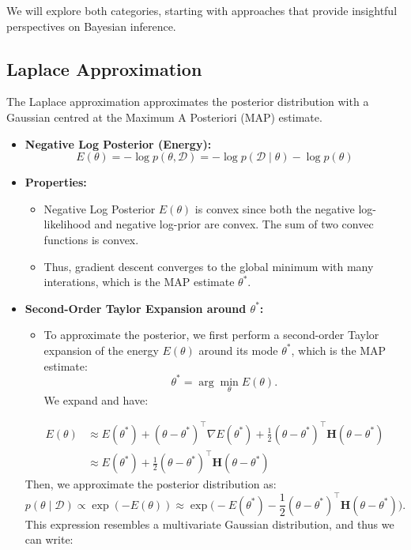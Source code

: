 We will explore both categories, starting with approaches that provide insightful perspectives on Bayesian inference.

\subsection{Laplace Approximation}

The Laplace approximation approximates the posterior distribution with a Gaussian centred at the Maximum A Posteriori (MAP) estimate.

\begin{itemize}
    \item \textbf{Negative Log Posterior (Energy):}
    \[
    E(\theta) = -\log p(\theta, \mathcal{D}) = -\log p(\mathcal{D} \mid \theta) - \log p(\theta)
    \]
    \item \textbf{Properties:}
    \begin{itemize}
        \item Negative Log Posterior $E(\theta)$ is convex since both the negative log-likelihood and negative log-prior are convex. The sum of two convec functions is convex.
        \item Thus, gradient descent converges to the global minimum with many interations, which is the MAP estimate $\theta^{*}$.
    \end{itemize}
    \item \textbf{Second-Order Taylor Expansion around $\theta^{*}$:}
    \begin{itemize}
        \item To approximate the posterior, we first perform a second-order Taylor expansion of the energy $E(\theta)$ around its mode $\theta^{*}$, which is the MAP estimate: 
        \[
        \theta^* = \arg\min_{\theta} E(\theta).
        \]
        We expand and have:
    \end{itemize}
    \begin{align*}
        E(\theta) &\approx E(\theta^*) + (\theta - \theta^*)^\top \nabla E(\theta^*) + \frac{1}{2} (\theta - \theta^*)^\top \mathbf{H} (\theta - \theta^*) \\
        &\approx E(\theta^*) + \frac{1}{2} (\theta - \theta^*)^\top \mathbf{H} (\theta - \theta^*)
    \end{align*}
    Then, we approximate the posterior distribution as:
    $$p(\theta\mid\mathcal{D})\propto\exp(-E(\theta))\approx\exp\biggl(-E(\theta^{*})-\frac{1}{2}(\theta-\theta^{*})^{\top}\mathbf{H}(\theta-\theta^{*})\biggr).$$
    This expression resembles a multivariate Gaussian distribution, and thus we can write:

\end{itemize}
